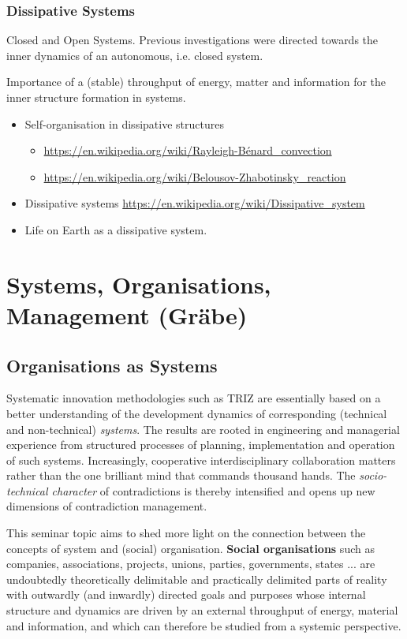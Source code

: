 \documentclass[11pt,a4paper]{article}
\begin{document}
\subsubsection*{Dissipative Systems}

Closed and Open Systems. Previous investigations were directed towards the
inner dynamics of an autonomous, i.e. closed system.

Importance of a (stable) throughput of energy, matter and information for the
inner structure formation in systems.

\begin{itemize}
\item Self-organisation in dissipative structures
  \begin{itemize}
  \item \url{https://en.wikipedia.org/wiki/Rayleigh-Bénard_convection}
  \item \url{https://en.wikipedia.org/wiki/Belousov-Zhabotinsky_reaction}
  \end{itemize}
\item Dissipative systems
  \url{https://en.wikipedia.org/wiki/Dissipative_system} 
\item Life on Earth as a dissipative system.
\end{itemize}

\section{Systems, Organisations, Management (Gräbe)}

\subsection{Organisations as Systems}

Systematic innovation methodologies such as TRIZ are essentially based on a
better understanding of the development dynamics of corresponding (technical
and non-technical) \emph{systems}.  The results are rooted in engineering and
managerial experience from structured processes of planning, implementation
and operation of such systems. Increasingly, cooperative interdisciplinary
collaboration matters rather than the one brilliant mind that commands
thousand hands. The \emph{socio-technical character} of contradictions is
thereby intensified and opens up new dimensions of contradiction management.

This seminar topic aims to shed more light on the connection between the
concepts of system and (social) organisation. \textbf{Social organisations}
such as companies, associations, projects, unions, parties, governments,
states ... are undoubtedly theoretically delimitable and practically delimited
parts of reality with outwardly (and inwardly) directed goals and purposes
whose internal structure and dynamics are driven by an external throughput of
energy, material and information, and which can therefore be studied from a
systemic perspective.
\end{document}
